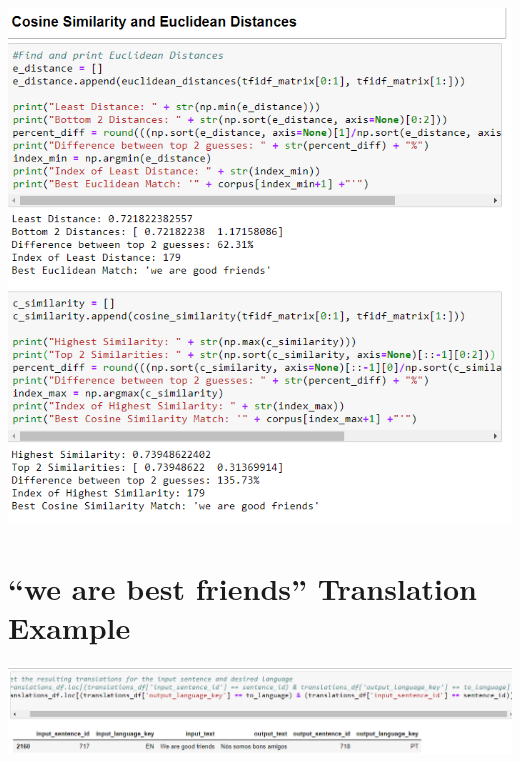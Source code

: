 \documentclass[runningheads]{llncs}
\begin{document}
	\begin{minipage}{\linewidth}
		\begin{center}
			\includegraphics[width=\linewidth]{Friends_Comparison.png}
			\label{fig:Sentence Comparison 1}
			\vspace*{1cm}
		\end{center}
	\end{minipage}
	\afterpage{\clearpage}


\section{``we are best friends'' Translation Example}
\hypertarget{Appendix D}{}


	\begin{minipage}{\linewidth}
		\begin{center}
			\includegraphics[width=\linewidth]{Language_Match.png}
			\label{fig:Translating Matched Sentence to Portuguese}
			\vspace*{1cm}
		\end{center}
	\end{minipage}
	\afterpage{\clearpage}
\end{document}
